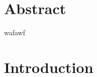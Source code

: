 \documentclass[11pt, titlepage, oneside, a4paper]{article}
\date{\specialdate\today}
\begin{document}


\onecolumn
\newpage
\setcounter{secnumdepth}{2}
\setcounter{tocdepth}{2}
\tableofcontents
\thispagestyle{empty}
\newpage
\setcounter{page}{1}
\setcounter{section}{0}

\newcommand{\Section}[1]{\section{#1}\vspace{-15pt}}
\newcommand{\Subsection}[1]{\vspace{-4pt}\subsection{#1}\vspace{-15pt}}
\newcommand{\Subsubsection}[1]{\vspace{-4pt}\subsubsection{#1}\vspace{-15pt}}




\section*{Abstract}
wafawf
\newpage

\Section{Introduction}

\twocolumn


\onecolumn

%
\end{document}
